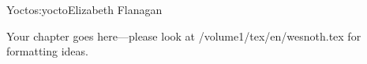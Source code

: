 \begin{aosachapter}{Yocto}{s:yocto}{Elizabeth Flanagan}

Your chapter goes here---please look at /volume1/tex/en/wesnoth.tex for 
formatting ideas.

\end{aosachapter}
